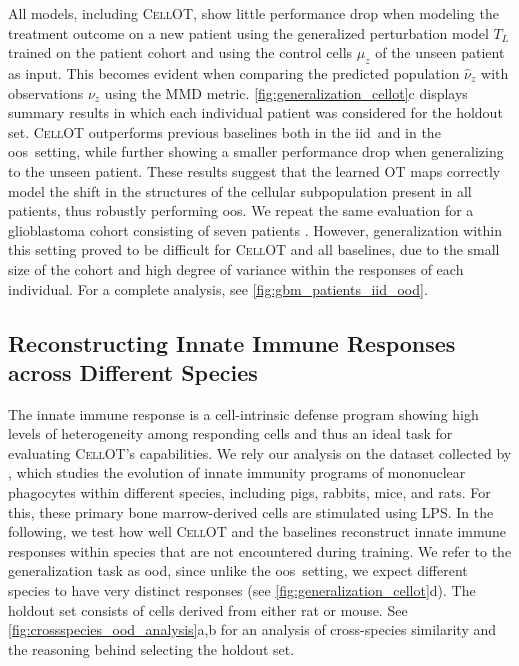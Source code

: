  All models, including \textsc{CellOT}, show little performance drop when modeling the treatment outcome on a new patient using the generalized perturbation model $T_L$ trained on the patient cohort and using the control cells $\mu_z$ of the unseen patient as input.
This becomes evident when comparing the predicted population $\hat{\nu}_z$ with observations $\nu_z$ using the \acrshort{MMD} metric. \cref{fig:generalization_cellot}c displays summary results in which each individual patient was considered for the holdout set. \textsc{CellOT} outperforms previous baselines both in the \acrshort{iid}~and in the \acrshort{oos}~setting, while further showing a smaller performance drop when generalizing to the unseen patient.
These results suggest that the learned \acrlong{OT} maps correctly model the shift in the structures of the cellular subpopulation present in all patients, thus robustly performing \acrlong{oos}.
We repeat the same evaluation for a glioblastoma cohort consisting of seven patients \citep{zhao2021deconvolution}. However, generalization within this setting proved to be difficult for \textsc{CellOT} and all baselines, due to the small size of the cohort and high degree of variance within the responses of each individual. 
For a complete analysis, see \cref{fig:gbm_patients_iid_ood}.


\subsection{Reconstructing Innate Immune Responses across Different Species}

The innate immune response is a cell-intrinsic defense program showing high levels of heterogeneity among responding cells and thus an ideal task for evaluating \textsc{CellOT}'s capabilities. We rely our analysis on the dataset collected by \citet{hagai2018gene}, which studies the evolution of innate immunity programs of mononuclear phagocytes within different species, including pigs, rabbits, mice, and rats. For this, these primary bone marrow-derived cells are stimulated using \acrshort{LPS}.
In the following, we test how well \textsc{CellOT} and the baselines reconstruct innate immune responses within species that are not encountered during training. We refer to the generalization task as \acrfull{ood}, since unlike the \acrshort{oos}~setting, we expect different species to have very distinct responses (see \cref{fig:generalization_cellot}d).
The holdout set consists of cells derived from either rat or mouse. See \cref{fig:crossspecies_ood_analysis}a,b for an analysis of cross-species similarity and the reasoning behind selecting the holdout set.

